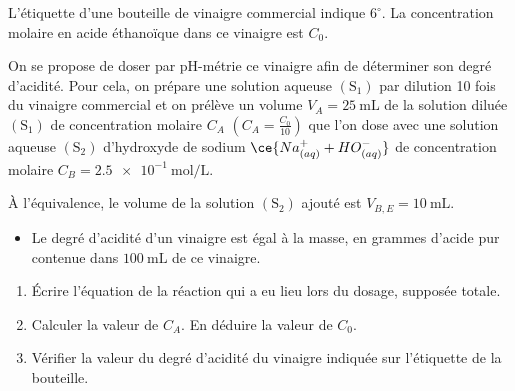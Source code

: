 L'étiquette d'une bouteille de vinaigre commercial indique $6^{\circ}$. La
concentration molaire en acide éthanoïque dans ce vinaigre est $C_{0}$.

On se propose de doser par pH-métrie ce vinaigre afin de déterminer son degré
d'acidité. Pour cela, on prépare une solution aqueuse $\mathrm{(S_{1})}$ par
dilution 10 fois du vinaigre commercial et on prélève un volume
${V_{A}=\qty{25}{\mL}}$ de la solution diluée $\mathrm{(S_{1})}$ de concentration
molaire $C_{A}$ $\left(C_{A}=\frac{C_{0}}{10}\right)$ que l'on dose avec une
solution aqueuse $\mathrm{(S_{2})}$ d'hydroxyde de sodium
$\ce{Na^{+}_{(aq)} + HO^{-}_{(aq)}}$ de concentration molaire
$C_{B}=\qty{2.5e-1}{\mol\per\L}$.

À l'équivalence, le volume de la solution $\mathrm{(S_{2})}$ ajouté est
$V_{B,E}=\qty{10}{\mL}$.

\begin{donnees}
    \begin{itemize}
        \item Le degré d'acidité d'un vinaigre est égal à la masse, en grammes
              d'acide pur contenue dans $\qty{100}{\mL}$ de ce vinaigre.
    \end{itemize}
\end{donnees}

\begin{enumerate}
    \item Écrire l'équation de la réaction qui a eu lieu lors du dosage,
          supposée totale.
    \item Calculer la valeur de $C_{A}$. En déduire la valeur de $C_{0}$.
    \item Vérifier la valeur du degré d'acidité du vinaigre indiquée sur
          l'étiquette de la bouteille.
\end{enumerate}
